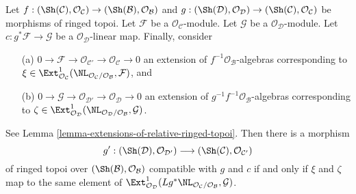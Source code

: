 \begin{lemma}
\label{lemma-extensions-of-relative-ringed-topoi-functorial}
Let $f : (\Sh(\mathcal{C}), \mathcal{O}_\mathcal{C}) \to
(\Sh(\mathcal{B}), \mathcal{O}_\mathcal{B})$ and
$g : (\Sh(\mathcal{D}), \mathcal{O}_\mathcal{D}) \to
(\Sh(\mathcal{C}), \mathcal{O}_\mathcal{C})$ be morphisms
of ringed topoi. Let $\mathcal{F}$ be a $\mathcal{O}_\mathcal{C}$-module.
Let $\mathcal{G}$ be a $\mathcal{O}_\mathcal{D}$-module. Let
$c : g^*\mathcal{F} \to \mathcal{G}$ be a $\mathcal{O}_\mathcal{D}$-linear
map. Finally, consider
\begin{enumerate}
\item[(a)]
$0 \to \mathcal{F} \to \mathcal{O}_{\mathcal{C}'} \to
\mathcal{O}_\mathcal{C} \to 0$
an extension of $f^{-1}\mathcal{O}_\mathcal{B}$-algebras
corresponding to
$\xi \in \Ext^1_{\mathcal{O}_\mathcal{C}}(
\NL_{\mathcal{O}_\mathcal{C}/\mathcal{O}_\mathcal{B}}, \mathcal{F})$, and
\item[(b)]
$0 \to \mathcal{G} \to \mathcal{O}_{\mathcal{D}'} \to
\mathcal{O}_\mathcal{D} \to 0$
an extension of $g^{-1}f^{-1}\mathcal{O}_\mathcal{B}$-algebras
corresponding to
$\zeta \in \Ext^1_{\mathcal{O}_\mathcal{D}}(
\NL_{\mathcal{O}_\mathcal{D}/\mathcal{O}_\mathcal{B}}, \mathcal{G})$.
\end{enumerate}
See Lemma \ref{lemma-extensions-of-relative-ringed-topoi}.
Then there is a morphism
$$
g' :
(\Sh(\mathcal{D}), \mathcal{O}_{\mathcal{D}'})
\longrightarrow
(\Sh(\mathcal{C}), \mathcal{O}_{\mathcal{C}'})
$$
of ringed topoi over $(\Sh(\mathcal{B}), \mathcal{O}_\mathcal{B})$
compatible with $g$ and $c$ if and only if $\xi$ and $\zeta$
map to the same element of
$\Ext^1_{\mathcal{O}_\mathcal{D}}(
Lg^*\NL_{\mathcal{O}_\mathcal{C}/\mathcal{O}_\mathcal{B}}, \mathcal{G})$.
\end{lemma}

